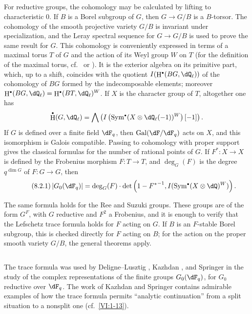 \documentclass[12pt,oneside,english]{smfbook}
\DeclareMathOperator{\gal}{Gal}
\DeclareMathOperator{\h}{H}
\newcounter{char}
\let\oldbullet\bullet
\renewcommand{\bullet}{\textnormal{\tiny$\oldbullet$}}
\begin{document}
\subsection{}\label{VI:8-2}

For reductive groups, the cohomology may be calculated by lifting to characteristic $0$. If $B$ is a Borel subgroup of $G$, then $G\to G/B$ is a $B$-torsor. The cohomology of the smooth projective variety $G/B$ is invariant under specialization, and the Leray spectral sequence for $G\to G/B$ is used to prove the same result for $G$. This cohomology is conveniently expressed in terms of a maximal torus $T$ of $G$ and the action of its Weyl group $W$ on $T$ (for the definition of the maximal torus, cf.\ \cite[VIII, \S2, Rem.~2]{bo05} or \cite[p.~105]{dl76}). It is the exterior algebra on its primitive part, which, up to a shift, coincides with the quotient $I(\h^\bullet(BG,\dQ_\ell))$ of the cohomology of $BG$ formed by the indecomposable elements; moreover $\h^\bullet(BG,\dQ_\ell)=\h^\bullet(BT,\dQ_\ell)^W$. If $X$ is the character group of $T$, altogether one has
\[
  \h^\bullet(G,\dQ_\ell) = \bigwedge \left(I\left(\operatorname{Sym}^\bullet(X\otimes \dQ_\ell(-1))^W\right)[-1]\right) \text{.}
\]
If $G$ is defined over a finite field $\dF_q$, then $\gal(\dF/\dF_q)$ acts on $X$, and this isomorphism is Galois compatible. Passing to cohomology with proper support gives the classical formulas for the number of rational points of $G$. If $F^\ast:X\to X$ is defined by the Frobenius morphism $F:T\to T$, and $\deg_G(F)$ is the degree $q^{\dim G}$ of $F:G\to G$, then
\begin{equation*}\tag{8.2.1}\label{VI:eq:8-2-1}
  \left|G_0(\dF_q)\right| = \deg_G(F) \cdot \det\left(1-{F^\ast}^{-1},I(\operatorname{Sym}^\bullet(X\otimes \dQ)^W)\right) \text{.}
\end{equation*}

The same formula holds for the Ree and Suzuki groups. These groups are of the form $G^F$, with $G$ reductive and $F^2$ a Frobenius, and it is enough to verify that the Lefschetz trace formula holds for $F$ acting on $G$. If $B$ is an $F$-stable Borel subgroup, this is checked directly for $F$ acting on $B$; for the action on the proper smooth variety $G/B$, the general theorems apply.

\subsection{}\label{VI:8-3}

The trace formula was used by Deligne--Lusztig \cite{dl76}, Kazhdan \cite{ka77}, and Springer \cite{sp76} in the study of the complex representations of the finite groups $G_0(\dF_q)$, for $G_0$ reductive over $\dF_q$. The work of Kazhdan and Springer contains admirable examples of how the trace formula permits ``analytic continuation'' from a split situation to a nonsplit one (cf.\ \ref{VI:1-13}).
\clearpage
\clearpage
\end{document}
